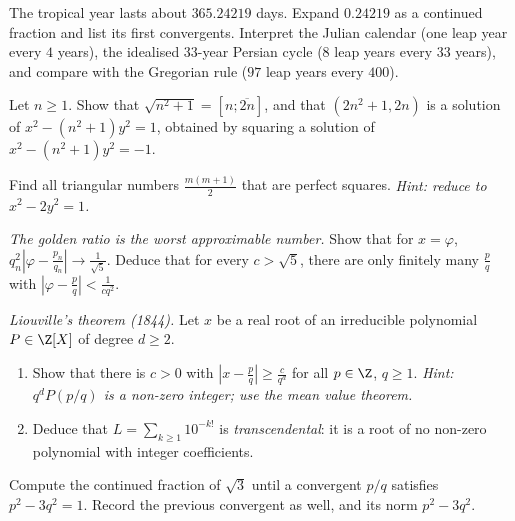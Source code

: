 \begin{exercise}[$\star\star$]\label{ex:calendar}
The tropical year lasts about $365.24219$ days. Expand $0.24219$ as a continued fraction and list its first convergents. Interpret the Julian calendar (one leap year every $4$ years), the idealised $33$-year Persian cycle ($8$ leap years every $33$ years), and compare with the Gregorian rule ($97$ leap years every $400$).
\end{exercise}

\begin{exercise}[$\star\star$]\label{ex:n21}
Let $n\ge1$. Show that $\sqrt{n^2+1}=[n;\overline{2n}]$, and that $(2n^2+1,2n)$ is a solution of $x^2-(n^2+1)y^2=1$, obtained by squaring a solution of $x^2-(n^2+1)y^2=-1$.
\end{exercise}

\begin{exercise}[$\star\star$]\label{ex:sqtri}
Find all triangular numbers $\frac{m(m+1)}2$ that are perfect squares. \emph{Hint: reduce to $x^2-2y^2=1$.}
\end{exercise}

\begin{exercise}[$\star\star$]\label{ex:golden}
\emph{The golden ratio is the worst approximable number.} Show that for $x=\varphi$, $q_n^2\left|\varphi-\frac{p_n}{q_n}\right|\to\frac1{\sqrt5}$. Deduce that for every $c>\sqrt5$, there are only finitely many $\frac pq$ with $\left|\varphi-\frac pq\right|<\frac1{cq^2}$.
\end{exercise}

\begin{exercise}[$\star\star\star$]\label{ex:liouville}
\emph{Liouville's theorem (1844).} Let $x$ be a real root of an irreducible polynomial $P\in\Z[X]$ of degree $d\ge2$.
\begin{enumerate}[label=(\alph*)]
\item Show that there is $c>0$ with $\left|x-\frac pq\right|\ge\frac c{q^d}$ for all $p\in\Z$, $q\ge1$. \emph{Hint: $q^dP(p/q)$ is a non-zero integer; use the mean value theorem.}
\item Deduce that $L=\sum_{k\ge1}10^{-k!}$ is \emph{transcendental}: it is a root of no non-zero polynomial with integer coefficients.
\end{enumerate}
\end{exercise}

\begin{exercise}[$\star\star$]\label{ex:t1-pell3}
Compute the continued fraction of $\sqrt 3$ until a convergent $p/q$ satisfies $p^2-3q^2=1$. Record the previous convergent as well, and its norm $p^2-3q^2$.
\end{exercise}

